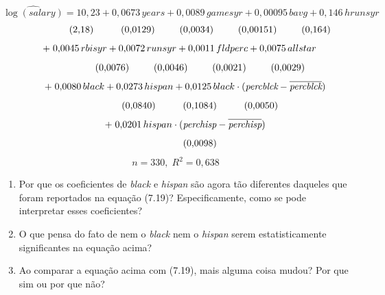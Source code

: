 \documentclass[12pt,letterpaper, onecolumn]{exam}
\begin{document}
\begin{questions}
\[
\widehat{\log(salary)} = 10{,}23 + 0{,}0673\,years + 0{,}0089\,gamesyr + 0{,}00095\,bavg + 0{,}146\,hrunsyr
\]
\[
\hspace{1.8cm} (2{,}18)\hspace{1.0cm}(0{,}0129)\hspace{0.9cm}(0{,}0034)\hspace{0.9cm}(0{,}00151)\hspace{0.9cm}(0{,}164)
\]
\[
\hspace{0.3cm} +\; 0{,}0045\,rbisyr + 0{,}0072\,runsyr + 0{,}0011\,fldperc + 0{,}0075\,allstar
\]
\[
\hspace{1.8cm} (0{,}0076)\hspace{0.9cm}(0{,}0046)\hspace{0.9cm}(0{,}0021)\hspace{0.9cm}(0{,}0029)
\]
\[
\hspace{0.7cm} +\; 0{,}0080\,black + 0{,}0273\,hispan + 0{,}0125\,black \cdot (\textit{percblck} - \overline{\textit{percblck}})
\]
\[
\hspace{1.8cm} (0{,}0840)\hspace{1.0cm}(0{,}1084)\hspace{1.0cm}(0{,}0050)
\]
\[
\hspace{0.7cm} +\; 0{,}0201\,hispan \cdot (\textit{perchisp} - \overline{\textit{perchisp}})
\]
\[
\hspace{1.8cm} (0{,}0098)
\]
\[
n = 330,\; R^2 = 0{,}638
\]

\begin{enumerate}[label=(\roman*)]
    \item Por que os coeficientes de \textit{black} e \textit{hispan} são agora tão diferentes daqueles que foram reportados na equação (7.19)? Especificamente, como se pode interpretar esses coeficientes?
    \item O que pensa do fato de nem o \textit{black} nem o \textit{hispan} serem estatisticamente significantes na equação acima?
    \item Ao comparar a equação acima com (7.19), mais alguma coisa mudou? Por que sim ou por que não?
\end{enumerate}

\vspace{0.7cm}


\end{questions}
\end{document}
